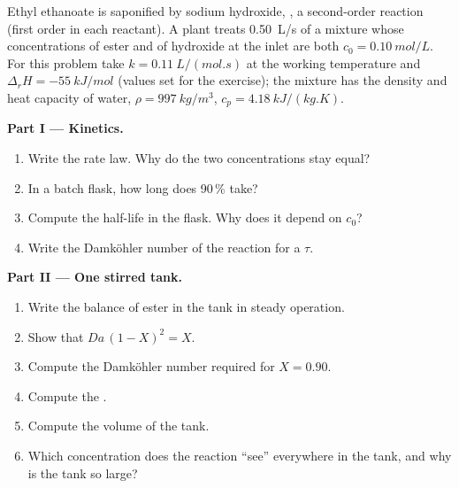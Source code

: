\begin{problem}
\label{pb:b2:continuous-reactors:1}
Ethyl ethanoate is saponified by sodium hydroxide,
, a second-order reaction (first
order in each reactant). A plant treats \qty{0.50}{L/s} of a mixture whose
concentrations of ester and of hydroxide at the inlet are both $c_0 =
\qty{0.10}{mol/L}$. For this problem take $k = \qty{0.11}{L/(mol.s)}$ at the
working temperature and $\Delta_r H = \qty{-55}{kJ/mol}$ (values set for the
exercise); the mixture has the density and heat capacity of water,
$\rho = \qty{997}{kg/m^3}$, $c_p = \qty{4.18}{kJ/(kg.K)}$.

\medskip
\noindent\textbf{Part I --- Kinetics.}
\begin{enumerate}
  \item Write the rate law. Why do the two concentrations stay equal?
  \item In a batch flask, how long does 90\,\%  take?
  \item Compute the half-life in the flask. Why does it depend on $c_0$?
  \item Write the Damköhler number of the reaction for a  $\tau$.
\end{enumerate}

\medskip
\noindent\textbf{Part II --- One stirred tank.}
\begin{enumerate}[resume]
  \item Write the balance of ester in the tank in steady operation.
  \item Show that $Da\,(1 - X)^2 = X$.
  \item Compute the Damköhler number required for $X = 0.90$.
  \item Compute the .
  \item Compute the volume of the tank.
  \item Which concentration does the reaction ``see'' everywhere in the tank,
        and why is the tank so large?
\end{enumerate}


\end{problem}
